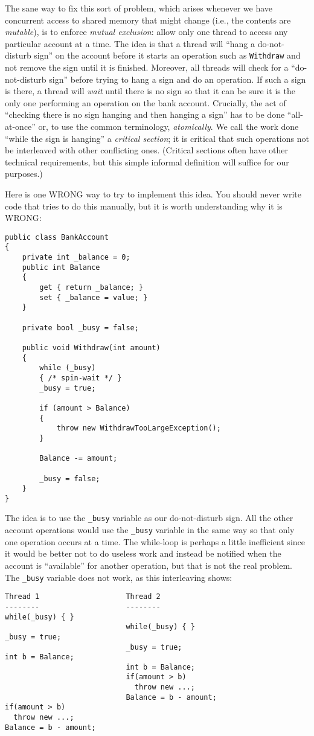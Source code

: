 \documentclass[10pt]{article}
\begin{document}
The sane way to fix this sort of problem, which arises whenever we
have concurrent access to shared memory that might change (i.e., the
contents are \emph{mutable}), is to enforce \emph{mutual exclusion}:
allow only one thread to access any particular account at a time.  The
idea is that a thread will ``hang a do-not-disturb sign'' on the
account before it starts an operation such as {\tt Withdraw} and not
remove the sign until it is finished.  Moreover, all threads will
check for a ``do-not-disturb sign'' before trying to hang a sign and
do an operation.  If such a sign is there, a thread will \emph{wait}
until there is no sign so that it can be sure it is the only one
performing an operation on the bank account.  Crucially, the act of
``checking there is no sign hanging and then hanging a sign'' has to
be done ``all-at-once'' or, to use the common terminology,
\emph{atomically}.  We call the work done
``while the sign is hanging'' a \emph{critical section}; it is
critical that such operations not be interleaved with other
conflicting ones.  (Critical sections often have other technical
requirements, but this simple informal definition will suffice for our
purposes.)

Here is one WRONG way to try to implement this idea.  You should never
write code that tries to do this manually, but it is worth
understanding why it is WRONG:
\begin{verbatim}
public class BankAccount
{
    private int _balance = 0;
    public int Balance
    {
        get { return _balance; }
        set { _balance = value; }
    }

    private bool _busy = false;

    public void Withdraw(int amount)
    {
        while (_busy)
        { /* spin-wait */ }
        _busy = true;

        if (amount > Balance)
        {
            throw new WithdrawTooLargeException();
        }

        Balance -= amount;

        _busy = false;
    }
}
\end{verbatim}
The idea is to use the {\tt \_busy} variable as our do-not-disturb
sign.  All the other account operations would use the {\tt \_busy}
variable in the same way so that only one operation occurs at a time.
The while-loop is perhaps a little inefficient since it would be
better not to do useless work and instead be notified when the account
is ``available'' for another operation, but that is not the real
problem.  The {\tt \_busy} variable does not work, as this interleaving
shows:
\begin{verbatim}
Thread 1                    Thread 2
--------                    --------
while(_busy) { }
                            while(_busy) { }
_busy = true;
                            _busy = true;
int b = Balance;
                            int b = Balance;
                            if(amount > b)
                              throw new ...;
                            Balance = b - amount;
if(amount > b)
  throw new ...;
Balance = b - amount;
\end{verbatim}
\end{document}
